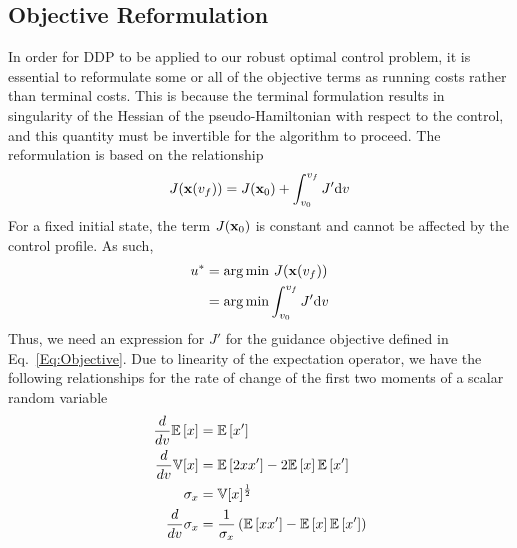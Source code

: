 \subsection{Objective Reformulation}
In order for DDP to be applied to our robust optimal control problem, it is essential to reformulate some or all of the objective terms as running costs rather than terminal costs. This is because the terminal formulation results in singularity of the Hessian of the pseudo-Hamiltonian with respect to the control, and this quantity must be invertible for the algorithm to proceed. 
The reformulation is based on the relationship 
\begin{align}
	J(\mathbf{x}(v_f)) = J(\mathbf{x}_0) + \int_{v_0}^{v_f}J'\mathrm{d}v \label{Eq:GenericCostRate}
\end{align}
For a fixed initial state, the term $J(\mathbf{x}_0)$ is constant and cannot be affected by the control profile. As such, 
\begin{align}
	u^* &= \arg\min \,J(\mathbf{x}(v_f)) \\
	&= \arg\min\int_{v_0}^{v_f}J'\mathrm{d}v
\end{align}
Thus, we need an expression for $J'$ for the guidance objective defined in Eq.~\eqref{Eq:Objective}. Due to linearity of the expectation operator, we have the following relationships for the rate of change of the first two moments of a scalar random variable
\begin{align}
	\frac{d }{d v}\mathbb{E}\left[x\right] &= \mathbb{E}\left[x'\right] \label{Eq:MeanRateVel}\\
	\frac{d }{d v}\mathbb{V}[x] &= \mathbb{E}\left[2xx'\right] - 2\mathbb{E}\left[x\right]\mathbb{E}\left[x'\right] \\
	\sigma_x &= \mathbb{V}[x]^{\frac{1}{2}} \\
	\frac{d }{d v}\sigma_x &= \frac{1}{\sigma_x}\left(\mathbb{E}\left[xx'\right] - \mathbb{E}\left[x\right]\mathbb{E}\left[x'\right]\right) \label{Eq:StdRateVel}
\end{align}
